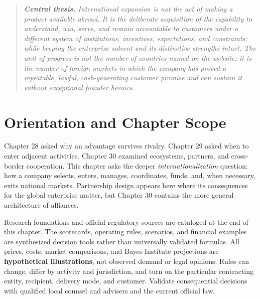 
\begin{quote}
\itshape
\textbf{Central thesis.} International expansion is not the act of making a product available abroad. It is the deliberate acquisition of the capability to understand, win, serve, and remain accountable to customers under a different system of institutions, incentives, expectations, and constraints: while keeping the enterprise solvent and its distinctive strengths intact. The unit of progress is not the number of countries named on the website; it is the number of foreign markets in which the company has proved a repeatable, lawful, cash-generating customer promise and can sustain it without exceptional founder heroics.
\end{quote}

\section*{Orientation and Chapter Scope}

Chapter 28 asked why an advantage survives rivalry. Chapter 29 asked when to enter adjacent activities. Chapter 30 examined ecosystems, partners, and cross-border cooperation. This chapter asks the deeper \textit{internationalization} question: how a company selects, enters, manages, coordinates, funds, and, when necessary, exits national markets. Partnership design appears here where its consequences for the global enterprise matter, but Chapter 30 contains the more general architecture of alliances.

Research foundations and official regulatory sources are cataloged at the end of this chapter. The scorecards, operating rules, scenarios, and financial examples are synthesized decision tools rather than universally validated formulas. All prices, costs, market comparisons, and Bayes Institute projections are \textbf{hypothetical illustrations}, not observed demand or legal opinions. Rules can change, differ by activity and jurisdiction, and turn on the particular contracting entity, recipient, delivery mode, and customer. Validate consequential decisions with qualified local counsel and advisers and the current official law.

